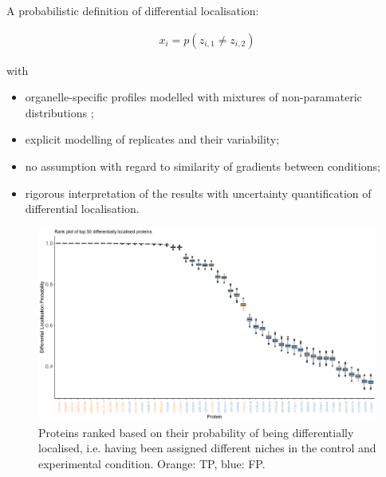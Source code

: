 \documentclass{beamer}
\theoremstyle{example}
\begin{document}
\begin{frame}
  A probabilistic definition of differential localisation:

  \begin{align}
    {x}_i = p ( z_{i, 1} \neq z_{i, 2} )
  \end{align}

  with

  \begin{itemize}
  \item organelle-specific profiles modelled with mixtures of
    non-paramateric distributions \citep{Crook:2019b};
  \item explicit modelling of replicates and their variability;
  \item no assumption with regard to similarity of gradients between
    conditions;
  \item rigorous interpretation of the results with uncertainty
    quantification of differential localisation.
  \end{itemize}

\end{frame}


\begin{frame}
  \begin{figure}[h]
    \centering
    \includegraphics[width=\linewidth]{./figs/rankboxplot.pdf}
    \caption{Proteins ranked based on their probability of being
      differentially localised, i.e. having been assigned different
      niches in the control and experimental condition. Orange: TP,
      blue: FP.}
  \end{figure}
\end{frame}
\end{document}
